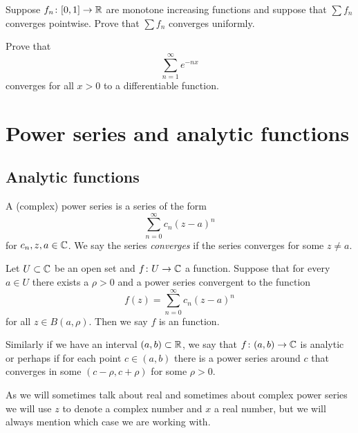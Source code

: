 \begin{exercise}
Suppose $f_n \colon [0,1] \to {\mathbb{R}}$ are monotone increasing functions and
suppose that $\sum f_n$ converges pointwise.  Prove that $\sum f_n$
converges uniformly.
\end{exercise}

\begin{exercise}
Prove that
\begin{equation*}
\sum_{n=1}^\infty e^{-nx}
\end{equation*}
converges for all $x > 0$ to a differentiable function.
\end{exercise}


\sectionnewpage
\section{Power series and analytic functions}
\label{sec:analfuncs}


\subsection{Analytic functions}

A (complex) power series is a series of the form
\begin{equation*}
\sum_{n=0}^\infty c_n {(z-a)}^n
\end{equation*}
for $c_n, z, a \in {\mathbb{C}}$.  We say the series
\emph{converges} if the series converges for
some $z \not= a$.

Let $U \subset {\mathbb{C}}$ be an open set and
$f \colon U \to {\mathbb{C}}$ a function.
Suppose that for every $a \in U$ there exists a $\rho > 0$ and a power
series convergent to the function
\begin{equation*}
f(z) = \sum_{n=0}^\infty c_n {(z-a)}^n
\end{equation*}
for all $z \in B(a,\rho)$.
Then we say $f$ is an \emph{} function.

Similarly if we have an interval $(a,b) \subset {\mathbb{R}}$, we say that $f \colon (a,b)
\to {\mathbb{C}}$ is analytic or perhaps \emph{}
if for each point $c \in
(a,b)$ there is a power series around $c$ that converges in some
$(c-\rho,c+\rho)$
for some $\rho > 0$.

As we will sometimes talk about real and sometimes about complex power
series we will use $z$ to denote a complex number and $x$ a real number, but
we will always mention which case we are working with.

